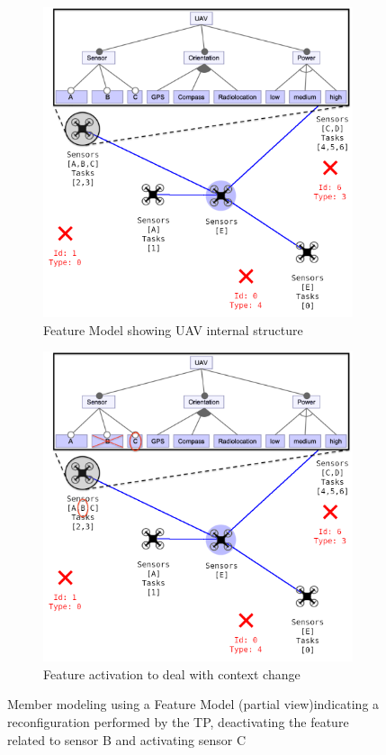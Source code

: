 \begin{figure}[!htbp]
	\centering
	\begin{subfigure}[t]{.45\textwidth}
	\centering
	    \includegraphics[width=0.95\linewidth]{img/scenario_01.png}
	    \caption{Feature Model showing UAV internal structure\label{fig:scene01}}
	\end{subfigure}
	\begin{subfigure}[t]{.45\textwidth}
	\centering
	    \includegraphics[width=0.95\linewidth]{img/scenario_02.png}
	    \caption{Feature activation to deal with context change\label{fig:scene02}}
	\end{subfigure}
	\caption{Member modeling using a Feature Model (partial view)indicating a reconfiguration performed by the TP, deactivating the feature related to sensor B and activating sensor C}
	\label{fig:TP_behavior}
\end{figure}

